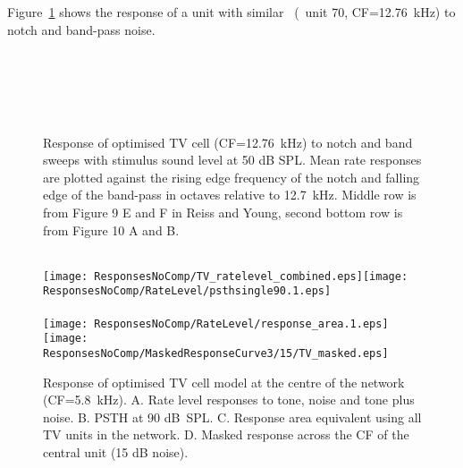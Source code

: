 

Figure~\ref{fig:TV_SweepUnit70} shows the response of a unit with similar \CF~(\TV~unit 70, CF=12.76~kHz) to notch and band-pass noise.

\begin{figure}[htb]
  \centering
  \\
  \\
  \\ \\
  \caption[Response of optimised TV cell (CF=12.76~kHz) to notch and band   sweeps]{Response of optimised TV cell (CF=12.76~kHz) to notch and band sweeps with stimulus sound level at 50 dB SPL\@.
Mean rate responses are plotted against the rising edge frequency of the notch and falling edge of the band-pass in octaves relative to 12.7~kHz.
Middle row is from Figure 9 E and F in Reiss and Young, second bottom row is from Figure 10 A and B. }   \label{fig:TV_SweepUnit70}
\end{figure}


\begin{figure}[htb]
{}\hspace{0.5\textwidth}\hfill\\
\texttt{[image: ResponsesNoComp/TV\_ratelevel\_combined.eps]}\texttt{[image: ResponsesNoComp/RateLevel/psthsingle90.1.eps]}\\
\hspace{0.5\textwidth}\hfill\\
\texttt{[image: ResponsesNoComp/RateLevel/response\_area.1.eps]}%
\texttt{[image: ResponsesNoComp/MaskedResponseCurve3/15/TV\_masked.eps]}\\
\caption[Optimised TV cell model responses]{Response of optimised TV cell model at the centre of the network (CF=5.8~kHz). A. Rate level responses to tone, noise and tone plus noise. B. PSTH at 90 dB~SPL.  C. Response area equivalent using all TV units in the network. D. Masked response across the CF of the central unit (15 dB noise).} \label{fig:TV_verification}
\end{figure}



